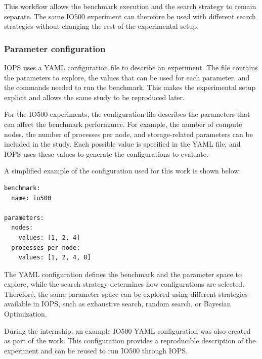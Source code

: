 This workflow allows the benchmark execution and the search strategy to
remain separate. The same IO500 experiment can therefore be used with
different search strategies without changing the rest of the experimental
setup.


\subsubsection{Parameter configuration}

IOPS uses a YAML configuration file to describe an experiment. The file
contains the parameters to explore, the values that can be used for each
parameter, and the commands needed to run the benchmark. This makes the
experimental setup explicit and allows the same study to be reproduced
later.

For the IO500 experiments, the configuration file describes the parameters
that can affect the benchmark performance. For example, the number of
compute nodes, the number of processes per node, and storage-related
parameters can be included in the study. Each possible value is specified
in the YAML file, and IOPS uses these values to generate the configurations
to evaluate.

A simplified example of the configuration used for this work is shown
below:

\begin{verbatim}
benchmark:
  name: io500

parameters:
  nodes:
    values: [1, 2, 4]
  processes_per_node:
    values: [1, 2, 4, 8]
\end{verbatim}


The YAML configuration defines the benchmark and the parameter space to
explore, while the search strategy determines how configurations are
selected. Therefore, the same parameter space can be explored using
different strategies available in IOPS, such as exhaustive search, random
search, or Bayesian Optimization.

During the internship, an example IO500 YAML configuration was also
created as part of the work. This configuration provides a reproducible
description of the experiment and can be reused to run IO500 through
IOPS.


